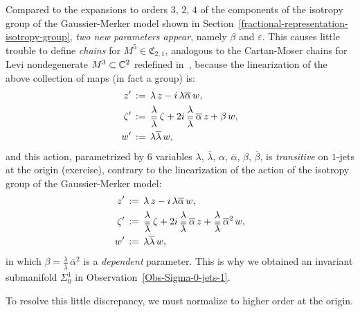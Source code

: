 \documentclass[12pt,twoside,leqno,openany]{amsart}
\begin{document}
Compared to the expansions to orders
$3$, $2$, $4$ of the components of the isotropy
group of the Gaussier-Merker model shown in
Section~{\ref{fractional-representation-isotropy-group}},
{\em two new parameters appear}, namely $\beta$ and $\varepsilon$.
This causes little trouble to define {\sl chains}
for $M^5 \in \mathfrak{C}_{2,1}$, 
analogous to the Cartan-Moser chains for 
Levi nondegenerate $M^3 \subset \mathbb{C}^2$ redefined
in~{\cite{Merker-2020}}, 
because the linearization of the above collection of maps
(in fact a group) is:
\[
\aligned
z'
&
\,:=\,
\lambda\,z
-
i\,\lambda\overline{\alpha}\,w,
\\
\zeta'
&
\,:=\,
\frac{\lambda}{\overline{\lambda}}\,
\zeta
+
2i\,\frac{\lambda}{\overline{\lambda}}\,\overline{\alpha}\,
z
+
\beta\,w,
\\
w'
&
\,:=\,
\lambda\overline{\lambda}\,
w,
\endaligned
\]
and this action, parametrized by $6$ variables
$\lambda$, $\overline{\lambda}$, 
$\alpha$, $\overline{\alpha}$, 
$\beta$, $\overline{\beta}$, is {\em transitive}
on $1$-jets at the origin (exercise),
contrary to the linearization of the action of the
isotropy group of the Gaussier-Merker model:
\[
\aligned
z'
&
\,:=\,
\lambda\,z
-
i\,\lambda\overline{\alpha}\,w,
\\
\zeta'
&
\,:=\,
\frac{\lambda}{\overline{\lambda}}\,
\zeta
+
2i\,\frac{\lambda}{\overline{\lambda}}\,\overline{\alpha}\,
z
+
\frac{\lambda}{\overline{\lambda}}\,\overline{\alpha}^2\,
w,
\\
w'
&
\,:=\,
\lambda\overline{\lambda}\,
w,
\endaligned
\]
in which $\beta = \frac{\lambda}{\overline{\lambda}}\,
\overline{\alpha}^2$ is a {\em dependent} parameter. This is why
we obtained an invariant
submanifold $\Sigma_0^1$ in 
Observation~{\ref{Obs-Sigma-0-jets-1}}.

To resolve this little discrepancy, we must normalize to higher
order at the origin.

\smallskip
\end{document}
